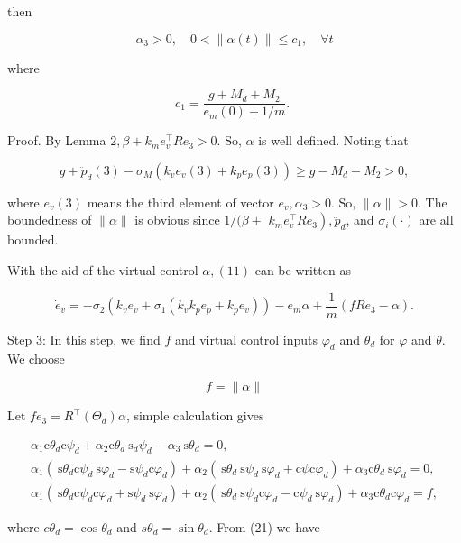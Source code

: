 \documentclass[10pt]{article}
\begin{document}
then

$$
\alpha_{3}>0, \quad 0<\|\alpha(t)\| \leq c_{1}, \quad \forall t
$$

where

$$
c_{1}=\frac{g+M_{d}+M_{2}}{e_{m}(0)+1 / m} \text {. }
$$

Proof. By Lemma $2, \beta+k_{m} e_{v}^{\top} R e_{3}>0$. So, $\alpha$ is well defined. Noting that

$$
g+\ddot{p}_{d}(3)-\sigma_{M}\left(k_{v} e_{v}(3)+k_{p} e_{p}(3)\right) \geq g-M_{d}-M_{2}>0,
$$

where $e_{v}(3)$ means the third element of vector $e_{v}, \alpha_{3}>0$. So, $\|\alpha\|>0$. The boundedness of $\|\alpha\|$ is obvious since $1 /(\beta+$ $\left.k_{m} e_{v}^{\top} R e_{3}\right), \ddot{p}_{d}$, and $\sigma_{i}(\cdot)$ are all bounded.

With the aid of the virtual control $\alpha,(11)$ can be written as

$$
\dot{e}_{v}=-\sigma_{2}\left(k_{v} e_{v}+\sigma_{1}\left(k_{v} k_{p} e_{p}+k_{p} e_{v}\right)\right)-e_{m} \alpha+\frac{1}{m}\left(f R e_{3}-\alpha\right) .
$$

Step 3: In this step, we find $f$ and virtual control inputs $\varphi_{d}$ and $\theta_{d}$ for $\varphi$ and $\theta$. We choose

$$
f=\|\alpha\|
$$

Let $f e_{3}=R^{\top}\left(\Theta_{d}\right) \alpha$, simple calculation gives

$$
\begin{gathered}
\alpha_{1} \mathrm{c} \theta_{d} \mathrm{c} \psi_{d}+\alpha_{2} \mathrm{c} \theta_{d} \mathrm{~s}_{d} \psi_{d}-\alpha_{3} \mathrm{~s} \theta_{d}=0, \\
\alpha_{1}\left(\mathrm{~s} \theta_{d} \mathrm{c} \psi_{d} \mathrm{~s} \varphi_{d}-\mathrm{s} \psi_{d} \mathrm{c} \varphi_{d}\right)+\alpha_{2}\left(\mathrm{~s} \theta_{d} \mathrm{~s} \psi_{d} \mathrm{~s} \varphi_{d}+\mathrm{c} \psi \mathrm{c} \varphi_{d}\right)+\alpha_{3} \mathrm{c} \theta_{d} \mathrm{~s} \varphi_{d}=0, \\
\alpha_{1}\left(\mathrm{~s} \theta_{d} \mathrm{c} \psi_{d} \mathrm{c} \varphi_{d}+\mathrm{s} \psi_{d} \mathrm{~s} \varphi_{d}\right)+\alpha_{2}\left(\mathrm{~s} \theta_{d} \mathrm{~s} \psi_{d} \mathrm{c} \varphi_{d}-\mathrm{c} \psi_{d} \mathrm{~s} \varphi_{d}\right)+\alpha_{3} \mathrm{c} \theta_{d} \mathrm{c} \varphi_{d}=f,
\end{gathered}
$$

where $c \theta_{d}=\cos \theta_{d}$ and $s \theta_{d}=\sin \theta_{d}$. From (21) we have
\end{document}
